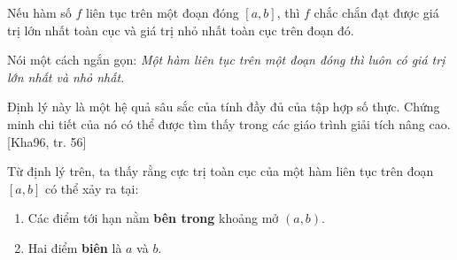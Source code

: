 \begin{theorem}\label{thm:extreme-value-theorem}
Nếu hàm số $f$ liên tục trên một đoạn đóng $[a, b]$, thì $f$ chắc chắn đạt được giá trị lớn nhất toàn cục và giá trị nhỏ nhất toàn cục trên đoạn đó.
\end{theorem}

Nói một cách ngắn gọn: \textit{Một hàm liên tục trên một đoạn đóng thì luôn có giá trị lớn nhất và nhỏ nhất.}

Định lý này là một hệ quả sâu sắc của tính đầy đủ của tập hợp số thực. Chứng minh chi tiết của nó có thể được tìm thấy trong các giáo trình giải tích nâng cao. [Kha96, tr. 56]

Từ định lý trên, ta thấy rằng cực trị toàn cục của một hàm liên tục trên đoạn $[a,b]$ có thể xảy ra tại:
\begin{enumerate}
    \item Các điểm tới hạn nằm \textbf{bên trong} khoảng mở $(a,b)$.
    \item Hai điểm \textbf{biên} là $a$ và $b$.
\end{enumerate}

